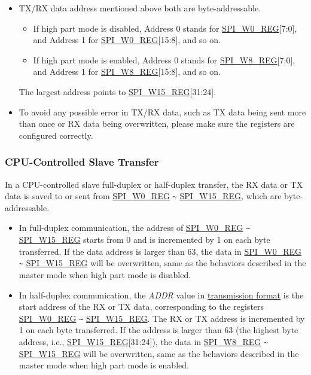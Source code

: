 \documentclass[main\_\_EN.tex]{subfiles}
\begin{document}
\begin{tiplisting}
\vspace{-2em}
\begin{itemize}
    \item TX/RX data address mentioned above both are byte-addressable.
    \begin{itemize}
        \item If high part mode is disabled, Address 0 stands for \hyperref[regdesc:SPIW0REG]{SPI\_W0\_REG}[7:0], and Address 1 for \hyperref[regdesc:SPIW0REG]{SPI\_W0\_REG}[15:8], and so on.
        \item If high part mode is enabled, Address 0 stands for \hyperref[regdesc:SPIW0REG]{SPI\_W8\_REG}[7:0], and Address 1 for \hyperref[regdesc:SPIW0REG]{SPI\_W8\_REG}[15:8], and so on.
    \end{itemize}
    The largest address points to \hyperref[regdesc:SPIW0REG]{SPI\_W15\_REG}[31:24].
    \item To avoid any possible error in TX/RX data, such as TX data being sent more than once or RX data being overwritten, please make sure the registers are configured correctly.
\end{itemize}
\end{tiplisting}

\subsubsection{CPU-Controlled Slave Transfer} \label{para:cpu-controlled-slave-transfer}

In a CPU-controlled slave full-duplex or half-duplex transfer, the RX data or TX data is saved to or sent from \hyperref[regdesc:SPIW0REG]{SPI\_W0\_REG} \verb+~+ \hyperref[regdesc:SPIW0REG]{SPI\_W15\_REG}, which are byte-addressable.

\begin{itemize}
    \item In full-duplex communication, the address of \hyperref[regdesc:SPIW0REG]{SPI\_W0\_REG} \verb+~+ \hyperref[regdesc:SPIW0REG]{SPI\_W15\_REG} starts from 0 and is incremented by 1 on each byte transferred. If the data address is larger than 63, the data in \hyperref[regdesc:SPIW0REG]{SPI\_W0\_REG} \verb+~+ \hyperref[regdesc:SPIW0REG]{SPI\_W15\_REG} will be overwritten, same as the behaviors described in the master mode when high part mode is disabled.
    \item In half-duplex communication, the \emph{ADDR} value in \hyperref[para:spi-slave-comm-format]{transmission format} is the start address of the RX or TX data, corresponding to the registers \hyperref[regdesc:SPIW0REG]{SPI\_W0\_REG} \verb+~+ \hyperref[regdesc:SPIW0REG]{SPI\_W15\_REG}. The RX or TX address is incremented by 1 on each byte transferred. If the address is larger than 63 (the highest byte address, i.e., \hyperref[regdesc:SPIW0REG]{SPI\_W15\_REG}[31:24]), the data in \hyperref[regdesc:SPIW0REG]{SPI\_W8\_REG} \verb+~+ \hyperref[regdesc:SPIW0REG]{SPI\_W15\_REG} will be overwritten, same as the behaviors described in the master mode when high part mode is enabled.
\end{itemize}
\end{document}
